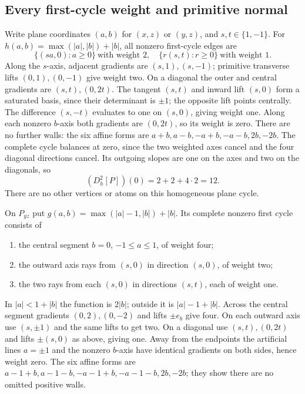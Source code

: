 \documentclass[11pt]{article}
\begin{document}
\subsection{Every first-cycle weight and primitive normal}
Write plane coordinates $(a,b)$ for $(x,z)$ or $(y,z)$, and $s,t\in\{1,-1\}$.
For $h(a,b)=\max(|a|,|b|)+|b|$, all nonzero first-cycle edges are
\[
 \{(sa,0):a\geq0\}\ \text{with weight }2,
 \quad \{r(s,t):r\geq0\}\ \text{with weight }1.
\]
Along the $s$-axis, adjacent gradients are $(s,1),(s,-1)$;
primitive transverse lifts $(0,1),(0,-1)$ give weight two.
On a diagonal the outer and central gradients are $(s,t),(0,2t)$.
The tangent $(s,t)$ and inward lift $(s,0)$ form a saturated basis,
since their determinant is $\pm1$; the opposite lift points centrally.
The difference $(s,-t)$ evaluates to one on $(s,0)$, giving weight one.
Along each nonzero $b$-axis both gradients are $(0,2t)$, so its weight
is zero. There are no further walls: the six affine forms are
$a+b,a-b,-a+b,-a-b,2b,-2b$.
The complete cycle balances at zero, since the two weighted axes cancel
and the four diagonal directions cancel. Its outgoing slopes are one
on the axes and two on the diagonals, so
\[
 (D_h^2[P])(0)=2+2+4\cdot2=12.
\]
There are no other vertices or atoms on this homogeneous plane cycle.

On $P_{yz}$ put $g(a,b)=\max(|a|-1,|b|)+|b|$.
Its complete nonzero first cycle consists of
\begin{enumerate}
\item the central segment $b=0$, $-1\leq a\leq1$, of weight four;
\item the outward axis rays from $(s,0)$ in direction $(s,0)$, of weight two;
\item the two rays from each $(s,0)$ in directions $(s,t)$, each of weight one.
\end{enumerate}
In $|a|<1+|b|$ the function is $2|b|$; outside it is $|a|-1+|b|$.
Across the central segment gradients $(0,2),(0,-2)$ and lifts $\pm e_b$
give four. On each outward axis use $(s,\pm1)$ and the same lifts to
get two. On a diagonal use $(s,t),(0,2t)$ and lifts $\pm(s,0)$ as
above, giving one. Away from the endpoints the artificial lines $a=\pm1$
and the nonzero $b$-axis have identical gradients on both sides, hence
weight zero. The six affine forms are
$a-1+b,a-1-b,-a-1+b,-a-1-b,2b,-2b$;
they show there are no omitted positive walls.
\end{document}
